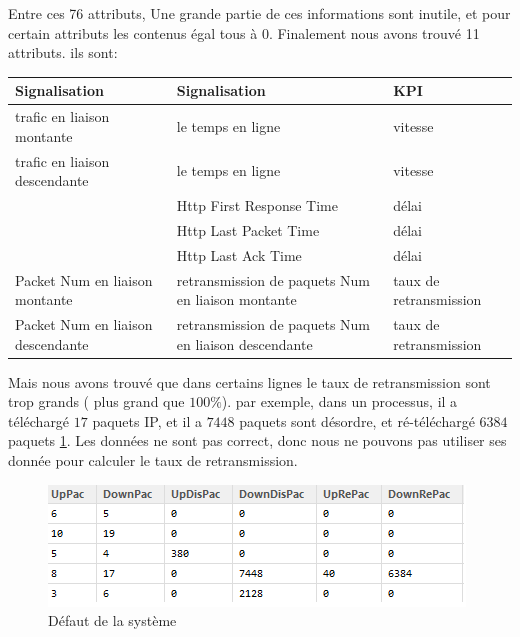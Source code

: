 Entre ces 76 attributs, Une grande partie de ces informations sont inutile, et pour certain attributs les contenus égal tous à 0. Finalement nous avons trouvé 11 attributs. ils sont:
\begin{table}[H]
\centering
\begin{tabular}{|>{\centering\arraybackslash}p{3 cm}|>{\centering\arraybackslash}p{3 cm}|>{\centering\arraybackslash}p{3 cm}|}
\hline \rule[-2ex]{0pt}{5.5ex} Signalisation & Signalisation & KPI \\ 
\hline \rule[-2ex]{0pt}{5.5ex} trafic en liaison montante & le temps en ligne & vitesse \\ 
\hline \rule[-2ex]{0pt}{5.5ex} trafic en liaison descendante  & le temps en ligne & vitesse \\ 
\hline \rule[-2ex]{0pt}{5.5ex}  & Http First Response Time & délai \\ 
\hline \rule[-2ex]{0pt}{5.5ex}  & Http Last Packet Time & délai \\ 
\hline \rule[-2ex]{0pt}{5.5ex}  & Http Last Ack Time & délai \\ 
\hline \rule[-2ex]{0pt}{5.5ex}  Packet Num en liaison montante & retransmission de paquets Num en liaison montante & taux de retransmission \\ 
\hline \rule[-2ex]{0pt}{5.5ex}  Packet Num en liaison descendante & retransmission de paquets Num en liaison descendante& taux de retransmission \\ 
\hline 
\end{tabular} 
\end{table}


Mais nous avons trouvé que dans certains lignes le taux de retransmission sont trop grands ( plus grand que $100\%$). par exemple, dans un processus, il a téléchargé  $17$ paquets IP, et il a  $7448$  paquets sont désordre, et  ré-téléchargé  $6384$ paquets  \ref{fig:défaut}. Les données ne sont pas correct, donc nous ne pouvons pas utiliser ses donnée pour calculer le taux de retransmission.  
\begin{figure}[H]
	\centering
	\includegraphics[width=0.7\linewidth]{images/11}
	\caption{Défaut de la système}
	\label{fig:défaut}
\end{figure}

